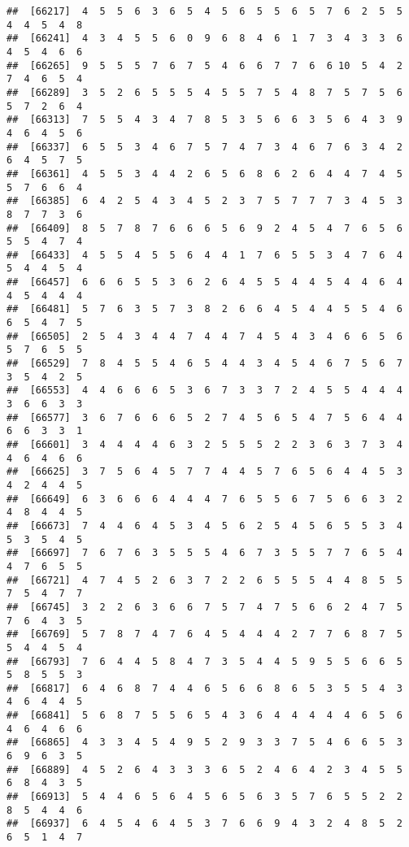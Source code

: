 \documentclass[
]{book}
\begin{document}
\begin{verbatim}
##  [66217]  4  5  5  6  3  6  5  4  5  6  5  5  6  5  7  6  2  5  5  4  4  5  4  8
##  [66241]  4  3  4  5  5  6  0  9  6  8  4  6  1  7  3  4  3  3  6  4  5  4  6  6
##  [66265]  9  5  5  5  7  6  7  5  4  6  6  7  7  6  6 10  5  4  2  7  4  6  5  4
##  [66289]  3  5  2  6  5  5  5  4  5  5  7  5  4  8  7  5  7  5  6  5  7  2  6  4
##  [66313]  7  5  5  4  3  4  7  8  5  3  5  6  6  3  5  6  4  3  9  4  6  4  5  6
##  [66337]  6  5  5  3  4  6  7  5  7  4  7  3  4  6  7  6  3  4  2  6  4  5  7  5
##  [66361]  4  5  5  3  4  4  2  6  5  6  8  6  2  6  4  4  7  4  5  5  7  6  6  4
##  [66385]  6  4  2  5  4  3  4  5  2  3  7  5  7  7  7  3  4  5  3  8  7  7  3  6
##  [66409]  8  5  7  8  7  6  6  6  5  6  9  2  4  5  4  7  6  5  6  5  5  4  7  4
##  [66433]  4  5  5  4  5  5  6  4  4  1  7  6  5  5  3  4  7  6  4  5  4  4  5  4
##  [66457]  6  6  6  5  5  3  6  2  6  4  5  5  4  4  5  4  4  6  4  4  5  4  4  4
##  [66481]  5  7  6  3  5  7  3  8  2  6  6  4  5  4  4  5  5  4  6  6  5  4  7  5
##  [66505]  2  5  4  3  4  4  7  4  4  7  4  5  4  3  4  6  6  5  6  5  7  6  5  5
##  [66529]  7  8  4  5  5  4  6  5  4  4  3  4  5  4  6  7  5  6  7  3  5  4  2  5
##  [66553]  4  4  6  6  6  5  3  6  7  3  3  7  2  4  5  5  4  4  4  3  6  6  3  3
##  [66577]  3  6  7  6  6  6  5  2  7  4  5  6  5  4  7  5  6  4  4  6  6  3  3  1
##  [66601]  3  4  4  4  4  6  3  2  5  5  5  2  2  3  6  3  7  3  4  4  6  4  6  6
##  [66625]  3  7  5  6  4  5  7  7  4  4  5  7  6  5  6  4  4  5  3  4  2  4  4  5
##  [66649]  6  3  6  6  6  4  4  4  7  6  5  5  6  7  5  6  6  3  2  4  8  4  4  5
##  [66673]  7  4  4  6  4  5  3  4  5  6  2  5  4  5  6  5  5  3  4  5  3  5  4  5
##  [66697]  7  6  7  6  3  5  5  5  4  6  7  3  5  5  7  7  6  5  4  4  7  6  5  5
##  [66721]  4  7  4  5  2  6  3  7  2  2  6  5  5  5  4  4  8  5  5  7  5  4  7  7
##  [66745]  3  2  2  6  3  6  6  7  5  7  4  7  5  6  6  2  4  7  5  7  6  4  3  5
##  [66769]  5  7  8  7  4  7  6  4  5  4  4  4  2  7  7  6  8  7  5  5  4  4  5  4
##  [66793]  7  6  4  4  5  8  4  7  3  5  4  4  5  9  5  5  6  6  5  5  8  5  5  3
##  [66817]  6  4  6  8  7  4  4  6  5  6  6  8  6  5  3  5  5  4  3  4  6  4  4  5
##  [66841]  5  6  8  7  5  5  6  5  4  3  6  4  4  4  4  4  6  5  6  4  6  4  6  6
##  [66865]  4  3  3  4  5  4  9  5  2  9  3  3  7  5  4  6  6  5  3  6  9  6  3  5
##  [66889]  4  5  2  6  4  3  3  3  6  5  2  4  6  4  2  3  4  5  5  6  8  4  3  5
##  [66913]  5  4  4  6  5  6  4  5  6  5  6  3  5  7  6  5  5  2  2  8  5  4  4  6
##  [66937]  6  4  5  4  6  4  5  3  7  6  6  9  4  3  2  4  8  5  2  6  5  1  4  7

\end{verbatim}
\end{document}
